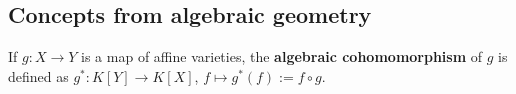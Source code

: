 \message{ !name(roughdraft.tex)}\documentclass[a4paper]{article}
\theoremstyle{prrt}
\begin{document}
\subsection{Concepts from algebraic geometry}


  If $g \colon X \rightarrow Y$ is a map of affine varieties, the \textbf{algebraic cohomomorphism} of $g$ is defined as $g^\ast \colon K[Y] \rightarrow K[X]$, $f\mapsto g^\ast(f) := f \circ g$.
  
\end{document}
